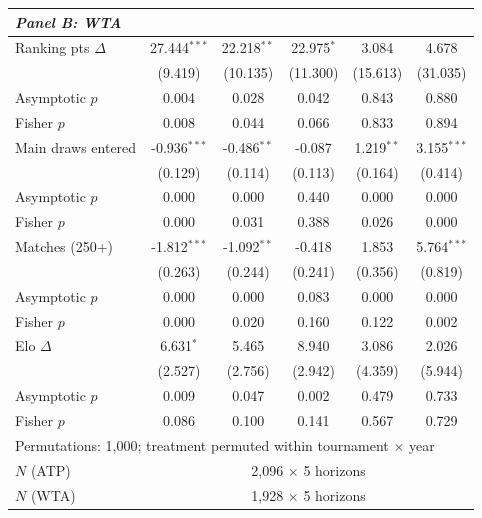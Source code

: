 \begin{tabular}{l ccccc}
\multicolumn{6}{l}{\textit{Panel B: WTA}} \\
\midrule
Ranking pts $\Delta$ & 27.444$^{***}$ & 22.218$^{**}$ & 22.975$^{*}$ & 3.084 & 4.678 \\
  & (9.419) & (10.135) & (11.300) & (15.613) & (31.035) \\
  Asymptotic $p$ & 0.004 & 0.028 & 0.042 & 0.843 & 0.880 \\
  Fisher $p$ & 0.008 & 0.044 & 0.066 & 0.833 & 0.894 \\[0.3em]
Main draws entered & -0.936$^{***}$ & -0.486$^{**}$ & -0.087 & 1.219$^{**}$ & 3.155$^{***}$ \\
  & (0.129) & (0.114) & (0.113) & (0.164) & (0.414) \\
  Asymptotic $p$ & 0.000 & 0.000 & 0.440 & 0.000 & 0.000 \\
  Fisher $p$ & 0.000 & 0.031 & 0.388 & 0.026 & 0.000 \\[0.3em]
Matches (250+) & -1.812$^{***}$ & -1.092$^{**}$ & -0.418 & 1.853 & 5.764$^{***}$ \\
  & (0.263) & (0.244) & (0.241) & (0.356) & (0.819) \\
  Asymptotic $p$ & 0.000 & 0.000 & 0.083 & 0.000 & 0.000 \\
  Fisher $p$ & 0.000 & 0.020 & 0.160 & 0.122 & 0.002 \\[0.3em]
Elo $\Delta$ & 6.631$^{*}$ & 5.465 & 8.940 & 3.086 & 2.026 \\
  & (2.527) & (2.756) & (2.942) & (4.359) & (5.944) \\
  Asymptotic $p$ & 0.009 & 0.047 & 0.002 & 0.479 & 0.733 \\
  Fisher $p$ & 0.086 & 0.100 & 0.141 & 0.567 & 0.729 \\[0.3em]
\midrule
\multicolumn{6}{l}{Permutations: 1,000; treatment permuted within tournament $\times$ year} \\
$N$ (ATP) & \multicolumn{5}{c}{2,096 $\times$ 5 horizons} \\
$N$ (WTA) & \multicolumn{5}{c}{1,928 $\times$ 5 horizons} \\
\bottomrule
\end{tabular}
